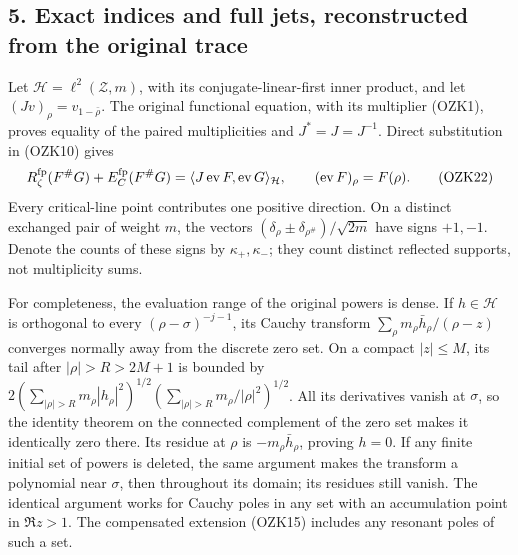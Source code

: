 \documentclass[
  10pt,
  a4paper,
]{article}
\begin{document}
\subsection{5. Exact indices and full jets, reconstructed from the
original
trace}\label{exact-indices-and-full-jets-reconstructed-from-the-original-trace}

Let \(\mathcal H=\ell^2(\mathcal Z,m)\), with its conjugate-linear-first
inner product, and let \((Jv)_\rho=v_{1-\bar\rho}\). The original
functional equation, with its multiplier (OZK1), proves equality of the
paired multiplicities and \(J^*=J=J^{-1}\). Direct substitution in
(OZK10) gives \[
R_\zeta^{\rm fp}(F^\#G)+E_C^{\rm fp}(F^\#G)
=\langle J\operatorname{ev}F,\operatorname{ev}G\rangle_{\mathcal H},
\qquad (\operatorname{ev}F)_\rho=F(\rho).
\tag{OZK22}
\] Every critical-line point contributes one positive direction. On a
distinct exchanged pair of weight \(m\), the vectors
\((\delta_\rho\pm\delta_{\rho^\#})/\sqrt{2m}\) have signs \(+1,-1\).
Denote the counts of these signs by \(\kappa_+,\kappa_-\); they count
distinct reflected supports, not multiplicity sums.

For completeness, the evaluation range of the original powers is dense.
If \(h\in\mathcal H\) is orthogonal to every \((\rho-\sigma)^{-j-1}\),
its Cauchy transform \(\sum_\rho m_\rho\bar h_\rho/(\rho-z)\) converges
normally away from the discrete zero set. On a compact \(|z|\le M\), its
tail after \(|\rho|>R>2M+1\) is bounded by
\(2(\sum_{|\rho|>R}m_\rho|h_\rho|^2)^{1/2}(\sum_{|\rho|>R}m_\rho/|\rho|^2)^{1/2}\).
All its derivatives vanish at \(\sigma\), so the identity theorem on the
connected complement of the zero set makes it identically zero there.
Its residue at \(\rho\) is \(-m_\rho\bar h_\rho\), proving \(h=0\). If
any finite initial set of powers is deleted, the same argument makes the
transform a polynomial near \(\sigma\), then throughout its domain; its
residues still vanish. The identical argument works for Cauchy poles in
any set with an accumulation point in \(\Re z>1\). The compensated
extension (OZK15) includes any resonant poles of such a set.
\end{document}
